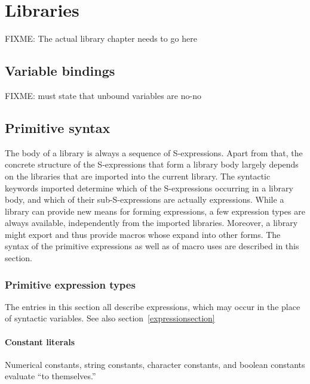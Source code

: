 \chapter{Libraries}
\label{librarychapter}

FIXME: The actual library chapter needs to go here

\section{Variable bindings}

FIXME: must state that unbound variables are no-no

\section{Primitive syntax}

The body of a library is always a sequence of S-expressions.  Apart
from that, the concrete structure of the S-expressions that form a
library body largely depends on the libraries that are imported into
the current library.  The syntactic keywords imported determine which
of the S-expressions occurring in a library body, and which of their
sub-S-expressions are actually expressions.  While a library can
provide new means for forming expressions, a few expression types are
always available, independently from the imported libraries.
Moreover, a library might export and thus provide macros whose expand
into other forms. The syntax of the primitive expressions as well as
of macro uses are described in this section.

\subsection{Primitive expression types}
\label{primitiveexpressionsection}

The entries in this section all describe expressions, which may occur
in the place of  syntactic variables.  See
also section~\ref{expressionsection}

\subsubsection*{Constant literals}\unsection

\begin{entry}{%
}

Numerical constants, string constants, character constants, and
boolean constants evaluate ``to themselves.''
\end{entry}

